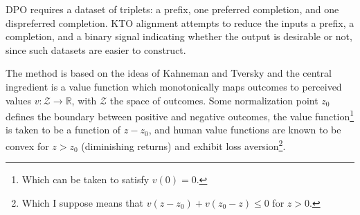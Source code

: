 DPO requires a dataset of triplets: a prefix, one preferred completion, and one dispreferred
completion. KTO alignment \cite{ethayarajh2024ktomodelalignmentprospect} attempts to reduce the
inputs a prefix, a completion, and a binary signal indicating whether the output is desirable or
not, since such datasets are easier to construct.

The method is based on the ideas of Kahneman and Tversky and the central ingredient is a value
function which monotonically maps outcomes to perceived values $ v: \mathcal{Z}\longrightarrow
\mathbb{R}$, with $ \mathcal{Z} $ the space of outcomes. Some normalization point $ z _{ 0 } $
defines the boundary between positive and negative outcomes, the value function\footnote{Which can
be taken to satisfy $ v(0)=0 $.} is taken to be a function of $ z-z _{ 0 } $, and human value
functions are known to be convex for $ z > z _{ 0 }$ (diminishing returns) and exhibit loss
aversion\footnote{Which I suppose means that $v \left ( z-z_0 \right) + v \left ( z _{ 0 }-z \right)
\le 0 $ for $ z>0 $.}.

